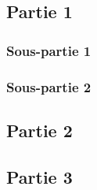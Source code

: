 \subsection{Partie 1}
\label{ssec:annexe2_partie1}
\subsubsection{Sous-partie 1}
\label{sssec:annexe2_partie1_sous1}
\subsubsection{Sous-partie 2}
\label{sssec:annexe2_partie1_sous2}
\subsection{Partie 2}
\label{ssec:annexe2_partie2}
\subsection{Partie 3}
\label{ssec:annexe2_partie3}
